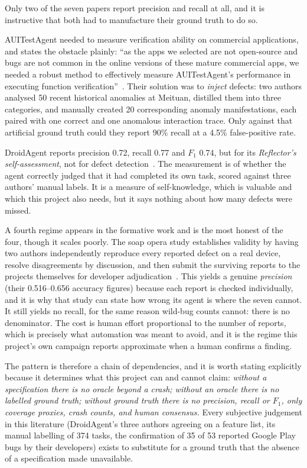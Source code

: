 Only two of the seven papers report precision and recall at all, and it is
instructive that both had to manufacture their ground truth to do so.

AUITestAgent needed to measure verification ability on commercial applications,
and states the obstacle plainly: ``as the apps we selected are not open-source
and bugs are not common in the online versions of these mature commercial apps,
we needed a robust method to effectively measure AUITestAgent's performance in
executing function verification''~\cite{auitestagent}. Their solution was to
\emph{inject} defects: two authors analysed 50 recent historical anomalies at
Meituan, distilled them into three categories, and manually created 20
corresponding anomaly manifestations, each paired with one correct and one
anomalous interaction trace. Only against that artificial ground truth could
they report 90\% recall at a 4.5\% false-positive rate.

DroidAgent reports precision 0.72, recall 0.77 and $F_1$ 0.74, but for its
\emph{Reflector's self-assessment}, not for defect detection~\cite{droidagent}.
The measurement is of whether the agent correctly judged that it had completed
its own task, scored against three authors' manual labels. It is a measure of
self-knowledge, which is valuable and which this project also needs, but it
says nothing about how many defects were missed.

A fourth regime appears in the formative work and is the most honest of the
four, though it scales poorly. The soap opera study establishes validity by
having two authors independently reproduce every reported defect on a real
device, resolve disagreements by discussion, and then submit the surviving
reports to the projects themselves for developer
adjudication~\cite{soapopera}. This yields a genuine \emph{precision} (their
0.516--0.656 accuracy figures) because each report is checked individually, and
it is why that study can state how wrong its agent is where the seven cannot.
It still yields no recall, for the same reason wild-bug counts cannot: there is
no denominator. The cost is human effort proportional to the number of reports,
which is precisely what automation was meant to avoid, and it is the regime
this project's own campaign reports approximate when a human confirms a finding.

The pattern is therefore a chain of dependencies, and it is worth stating
explicitly because it determines what this project can and cannot claim:
\emph{without a specification there is no oracle beyond a crash; without an
oracle there is no labelled ground truth; without ground truth there is no
precision, recall or $F_1$, only coverage proxies, crash counts, and human
consensus.} Every subjective judgement in this literature (DroidAgent's three
authors agreeing on a feature list, its manual labelling of 374 tasks, the
confirmation of 35 of 53 reported Google Play bugs by their developers) exists
to substitute for a ground truth that the absence of a specification made
unavailable.


